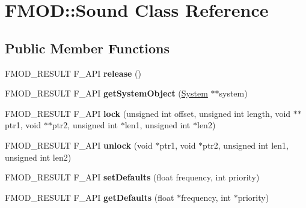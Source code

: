 \hypertarget{class_f_m_o_d_1_1_sound}{\section{F\+M\+O\+D\+:\+:Sound Class Reference}
\label{class_f_m_o_d_1_1_sound}
}
\subsection*{Public Member Functions}
\begin{DoxyCompactItemize}
\item 
\hypertarget{class_f_m_o_d_1_1_sound_ab0d8425b6f8ad26b4011dc36fee9948c}{F\+M\+O\+D\+\_\+\+R\+E\+S\+U\+L\+T F\+\_\+\+A\+P\+I {\bfseries release} ()}\label{class_f_m_o_d_1_1_sound_ab0d8425b6f8ad26b4011dc36fee9948c}

\item 
\hypertarget{class_f_m_o_d_1_1_sound_aed24d7342fc12299472454730828987e}{F\+M\+O\+D\+\_\+\+R\+E\+S\+U\+L\+T F\+\_\+\+A\+P\+I {\bfseries get\+System\+Object} (\hyperlink{class_f_m_o_d_1_1_system}{System} $\ast$$\ast$system)}\label{class_f_m_o_d_1_1_sound_aed24d7342fc12299472454730828987e}

\item 
\hypertarget{class_f_m_o_d_1_1_sound_a0f83fccead6df86323a21a0ae0207c61}{F\+M\+O\+D\+\_\+\+R\+E\+S\+U\+L\+T F\+\_\+\+A\+P\+I {\bfseries lock} (unsigned int offset, unsigned int length, void $\ast$$\ast$ptr1, void $\ast$$\ast$ptr2, unsigned int $\ast$len1, unsigned int $\ast$len2)}\label{class_f_m_o_d_1_1_sound_a0f83fccead6df86323a21a0ae0207c61}

\item 
\hypertarget{class_f_m_o_d_1_1_sound_ab80dbd8fdc67d3b4c0358de311865da3}{F\+M\+O\+D\+\_\+\+R\+E\+S\+U\+L\+T F\+\_\+\+A\+P\+I {\bfseries unlock} (void $\ast$ptr1, void $\ast$ptr2, unsigned int len1, unsigned int len2)}\label{class_f_m_o_d_1_1_sound_ab80dbd8fdc67d3b4c0358de311865da3}

\item 
\hypertarget{class_f_m_o_d_1_1_sound_a50de3be9a532bfa635f7e2ba0b0b8a1e}{F\+M\+O\+D\+\_\+\+R\+E\+S\+U\+L\+T F\+\_\+\+A\+P\+I {\bfseries set\+Defaults} (float frequency, int priority)}\label{class_f_m_o_d_1_1_sound_a50de3be9a532bfa635f7e2ba0b0b8a1e}

\item 
\hypertarget{class_f_m_o_d_1_1_sound_a985bdd51ef10085677bb1b3cfd160e03}{F\+M\+O\+D\+\_\+\+R\+E\+S\+U\+L\+T F\+\_\+\+A\+P\+I {\bfseries get\+Defaults} (float $\ast$frequency, int $\ast$priority)}\label{class_f_m_o_d_1_1_sound_a985bdd51ef10085677bb1b3cfd160e03}


\end{DoxyCompactItemize}
